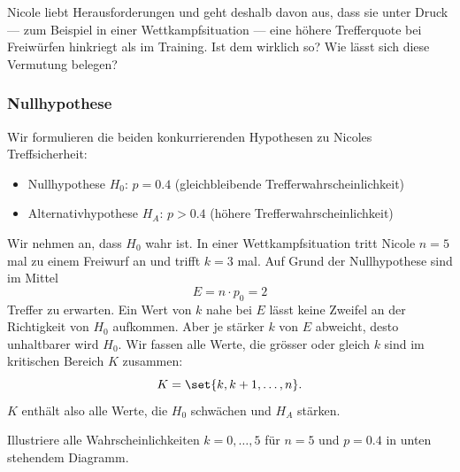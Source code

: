 \documentclass[%
11pt,%
twoside,%
titlepage,%
german,%
headsepline%
]{scrartcl}
\begin{document}
Nicole liebt Herausforderungen und geht deshalb davon aus, dass sie unter Druck --- zum Beispiel in einer Wettkampfsituation --- eine höhere Trefferquote bei Freiwürfen hinkriegt als im Training. Ist dem wirklich so? Wie lässt sich diese Vermutung belegen?

\subsubsection{Nullhypothese}

Wir formulieren die beiden konkurrierenden Hypothesen zu Nicoles Treffsicherheit:

\begin{itemize}
\item Nullhypothese $H_0$: $p=0.4$ (gleichbleibende Trefferwahrscheinlichkeit)
\item Alternativhypothese $H_A$: $p>0.4$ (höhere Trefferwahrscheinlichkeit)
\end{itemize}

Wir nehmen an, dass $H_0$ wahr ist. In einer Wettkampfsituation tritt Nicole $n=5$ mal zu einem Freiwurf an und trifft $k=3$ mal. Auf Grund der Nullhypothese sind im Mittel
$$E=n\cdot p_0=2$$
Treffer zu erwarten. Ein Wert von $k$ nahe bei $E$ lässt keine Zweifel an der Richtigkeit von $H_0$ aufkommen. Aber je stärker $k$ von $E$ abweicht, desto unhaltbarer wird $H_0$. Wir fassen alle Werte, die grösser oder gleich $k$ sind im kritischen Bereich $K$ zusammen:
$$K=\set{k,k+1,\dots,n}.$$
$K$ enthält also alle Werte, die $H_0$ schwächen und $H_A$ stärken.

\begin{ueb}
Illustriere alle Wahrscheinlichkeiten $k=0,\dots,5$ für $n=5$ und $p=0.4$ in unten stehendem Diagramm.
\end{ueb}

\begin{center}
\end{center}
\end{document}
